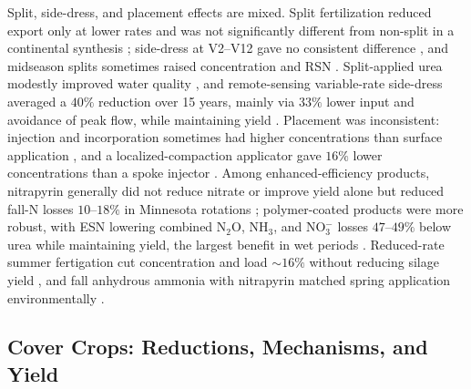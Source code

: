 \documentclass[11pt]{article}
\begin{document}
Split, side-dress, and placement effects are mixed. Split fertilization
reduced export only at lower rates \parencite{Liu2021} and was not
significantly different from non-split in a continental synthesis
\parencite{Hertzberger2019}; side-dress at V2--V12 gave no consistent
difference \parencite{Jaynes2013}, and midseason splits sometimes raised
concentration and RSN \parencite{Jaynes2006,Bandura2025}. Split-applied urea
modestly improved water quality \parencite{Waring2022}, and remote-sensing
variable-rate side-dress averaged a $40\%$ reduction over 15 years, mainly via
$33\%$ lower input and avoidance of peak flow, while maintaining yield
\parencite{Wilson2020b}. Placement was inconsistent: injection and
incorporation sometimes had higher concentrations than surface application
\parencite{Hertzberger2019}, and a localized-compaction applicator gave $16\%$
lower concentrations than a spoke injector \parencite{Bakhsh2010}. Among
enhanced-efficiency products, nitrapyrin generally did not reduce nitrate or
improve yield alone \parencite{Vetsch2019,Pittelkow2017} but reduced fall-N
losses $10$--$18\%$ in Minnesota rotations \parencite{Randall2003,Randall2005};
polymer-coated products were more robust, with ESN lowering combined N$_2$O,
NH$_3$, and NO$_3^-$ losses $47$--$49\%$ below urea while maintaining yield,
the largest benefit in wet periods \parencite{Menegaz2025,Nash2015,Nash2015b}.
Reduced-rate summer fertigation cut concentration and load $\sim16\%$ without
reducing silage yield \parencite{Gamble2018}, and fall anhydrous ammonia with
nitrapyrin matched spring application environmentally \parencite{Kaur2024,Kaur2024c}.

\subsection{Cover Crops: Reductions, Mechanisms, and Yield}
\end{document}
